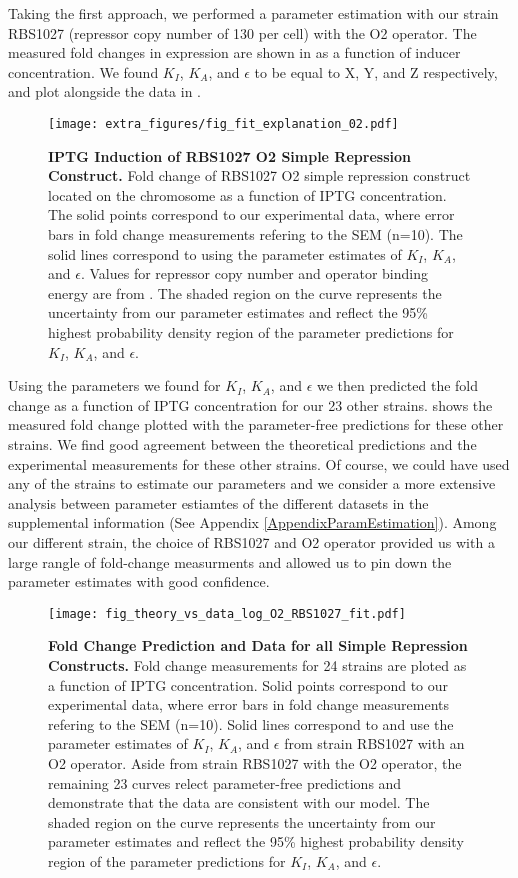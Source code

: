 Taking the first approach, we performed a parameter estimation with our strain RBS1027 (repressor copy number of 130 per cell) with the O2 operator. The measured fold changes in expression are shown in  as a function of inducer concentration. We found $K_I$, $K_A$, and $\epsilon$ to be equal to X, Y, and Z respectively, and plot \eref[eq7] alongside the data in . 

\begin{figure}[h]
	\centering \texttt{[image: extra\_figures/fig\_fit\_explanation\_02.pdf]}
	\caption{{\bf IPTG Induction of RBS1027 O2 Simple Repression Construct.} Fold change of RBS1027 O2 simple repression construct located on the chromosome as a function of IPTG concentration. The solid points correspond to our experimental data, where error bars in fold change measurements refering to the SEM (n=10). The solid lines correspond to \eref[eq7] using the parameter estimates of $K_I$, $K_A$, and $\epsilon$. Values for repressor copy number and operator binding energy are from \cite{Garcia2011}.  The shaded region on the curve represents the uncertainty from our parameter estimates and reflect the 95\% highest probability density region of the parameter predictions for $K_I$, $K_A$, and $\epsilon$.}
	\label{fig_result1}
\end{figure}

Using the parameters we found for $K_I$, $K_A$, and $\epsilon$ we then predicted the fold change as a function of IPTG concentration for our 23 other strains.  shows the measured fold change plotted with the parameter-free predictions for these other strains. We find good agreement between the theoretical predictions and the experimental measurements for these other strains. Of course, we could have used any of the strains to estimate our parameters and we consider a more extensive analysis between parameter estiamtes of the different datasets in the supplemental information (See Appendix \ref{AppendixParamEstimation}). Among our different strain, the choice of RBS1027 and O2 operator provided us with a large rangle of fold-change measurments and allowed us to pin down the parameter estimates with good confidence.  

\begin{figure}[h]
	\centering \texttt{[image: fig\_theory\_vs\_data\_log\_O2\_RBS1027\_fit.pdf]}
	\caption{{\bf Fold Change Prediction and Data for all Simple Repression Constructs.} Fold change measurements for 24 strains are ploted as a function of IPTG concentration. Solid points correspond to our experimental data, where error bars in fold change measurements refering to the SEM (n=10). Solid lines correspond to \eref[eq7] and use the parameter estimates of $K_I$, $K_A$, and $\epsilon$ from strain RBS1027 with an O2 operator. Aside from strain RBS1027 with the O2 operator, the remaining 23 curves relect parameter-free predictions and demonstrate that the data are consistent with our model. The shaded region on the curve represents the uncertainty from our parameter estimates and reflect the 95\% highest probability density region of the parameter predictions for $K_I$, $K_A$, and $\epsilon$.}
	\label{fig_result2}
\end{figure}

